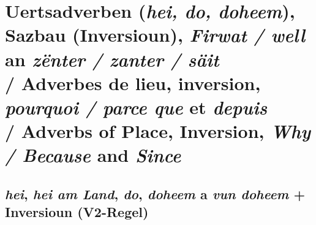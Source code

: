 \section[Uertsadverben, Inversioun, Firwat/well an zënter]{Uertsadverben (\textit{hei, do, doheem}), Sazbau (Inversioun), \textit{Firwat / well} an \textit{zënter / zanter / säit} \\/ Adverbes de lieu, inversion, \textit{pourquoi / parce que} et \textit{depuis} \\/ Adverbs of Place, Inversion, \textit{Why / Because} and \textit{Since}}

\subsection{\textit{hei}, \textit{hei am Land}, \textit{do}, \textit{doheem} a \textit{vun doheem} + Inversioun (V2-Regel)}

